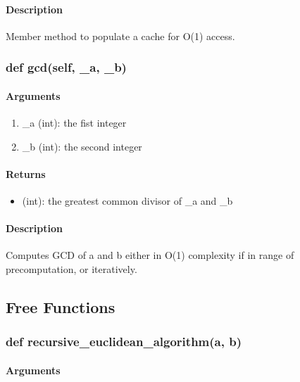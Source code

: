 \documentclass[refman]{scrartcl}
\begin{document}
\paragraph*{Description}

Member method to populate a cache for O(1) access.

\subsubsection{def gcd(self, \_a, \_b)}

\paragraph*{Arguments}

\begin{enumerate}
	\item \_a (int): the fist integer
	\item \_b (int): the second integer
\end{enumerate}

\paragraph*{Returns}

\begin{itemize}
	\item (int): the greatest common divisor of \_a and \_b
\end{itemize}

\paragraph*{Description}

Computes GCD of a and b either in O(1) complexity if in range of precomputation, or iteratively.

\subsection{Free Functions}

\subsubsection{def recursive\_euclidean\_algorithm(a, b)}

\paragraph*{Arguments}
\end{document}
